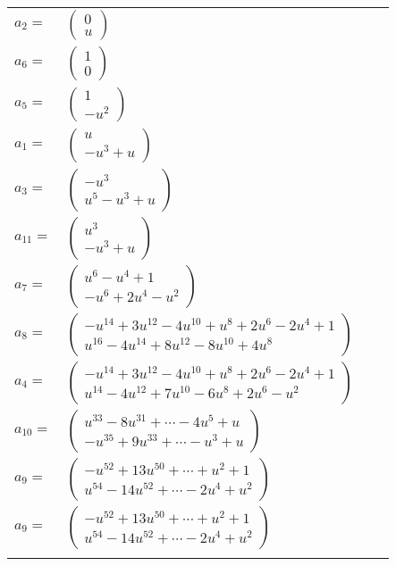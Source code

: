\documentclass[1p]{elsarticle_modified}
\theoremstyle{definition}
\begin{document}
\begin{tabular}{m{7pt} m{180pt} m{7pt} m{180pt} }
\flushright $a_{2}=$&$\begin{pmatrix}0\\u\end{pmatrix}$ \\
\flushright $a_{6}=$&$\begin{pmatrix}1\\0\end{pmatrix}$ \\
\flushright $a_{5}=$&$\begin{pmatrix}1\\- u^2\end{pmatrix}$ \\
\flushright $a_{1}=$&$\begin{pmatrix}u\\- u^3+u\end{pmatrix}$ \\
\flushright $a_{3}=$&$\begin{pmatrix}- u^3\\u^5- u^3+u\end{pmatrix}$ \\
\flushright $a_{11}=$&$\begin{pmatrix}u^3\\- u^3+u\end{pmatrix}$ \\
\flushright $a_{7}=$&$\begin{pmatrix}u^6- u^4+1\\- u^6+2 u^4- u^2\end{pmatrix}$ \\
\flushright $a_{8}=$&$\begin{pmatrix}- u^{14}+3 u^{12}-4 u^{10}+u^8+2 u^6-2 u^4+1\\u^{16}-4 u^{14}+8 u^{12}-8 u^{10}+4 u^8\end{pmatrix}$ \\
\flushright $a_{4}=$&$\begin{pmatrix}- u^{14}+3 u^{12}-4 u^{10}+u^8+2 u^6-2 u^4+1\\u^{14}-4 u^{12}+7 u^{10}-6 u^8+2 u^6- u^2\end{pmatrix}$ \\
\flushright $a_{10}=$&$\begin{pmatrix}u^{33}-8 u^{31}+\cdots-4 u^5+u\\- u^{35}+9 u^{33}+\cdots- u^3+u\end{pmatrix}$ \\
\flushright $a_{9}=$&$\begin{pmatrix}- u^{52}+13 u^{50}+\cdots+u^2+1\\u^{54}-14 u^{52}+\cdots-2 u^4+u^2\end{pmatrix}$\\ \flushright $a_{9}=$&$\begin{pmatrix}- u^{52}+13 u^{50}+\cdots+u^2+1\\u^{54}-14 u^{52}+\cdots-2 u^4+u^2\end{pmatrix}$\\&\end{tabular}
\end{document}
